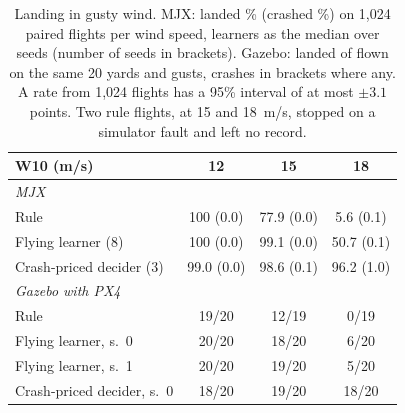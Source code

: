 \begin{table}[!tb]
\centering\small
\setlength{\tabcolsep}{3pt}
\caption{Landing in gusty wind. MJX: landed \% (crashed \%) on 1,024 paired flights per wind speed, learners as the median over seeds (number of seeds in brackets). Gazebo: landed of flown on the same 20 yards and gusts, crashes in brackets where any. A rate from 1,024 flights has a 95\% interval of at most $\pm 3.1$ points. Two rule flights, at 15 and 18~m/s, stopped on a simulator fault and left no record.}
\label{tab:wind}
\begin{tabular}{lccc}
\toprule
W10 (m/s) & 12 & 15 & 18 \\
\midrule
\multicolumn{4}{l}{\textit{MJX}} \\
Rule & 100 (0.0) & 77.9 (0.0) & 5.6 (0.1) \\
Flying learner (8) & 100 (0.0) & 99.1 (0.0) & 50.7 (0.1) \\
Crash-priced decider (3) & 99.0 (0.0) & 98.6 (0.1) & 96.2 (1.0) \\
\midrule
\multicolumn{4}{l}{\textit{Gazebo with PX4}} \\
Rule & 19/20 & 12/19 & 0/19 \\
Flying learner, s.~0 & 20/20 & 18/20 & 6/20 \\
Flying learner, s.~1 & 20/20 & 19/20 & 5/20 \\
Crash-priced decider, s.~0 & 18/20 & 19/20 & 18/20 \\
\bottomrule
\end{tabular}
\end{table}
